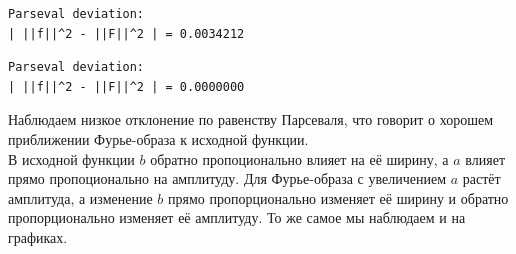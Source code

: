 \documentclass[a4paper]{article}
\begin{document}
\begin{minipage}{0.33\textwidth}
\begin{lstlisting}[caption={$a = 2$, $b = 1$}, numbers=none]
Parseval deviation:
| ||f||^2 - ||F||^2 | = 0.0034212
\end{lstlisting}
\end{minipage}\hfill
\begin{minipage}{0.33\textwidth}
\begin{lstlisting}[caption={$a = 2$, $b = 2$}, numbers=none]
Parseval deviation:
| ||f||^2 - ||F||^2 | = 0.0000000
\end{lstlisting}
\end{minipage}
Наблюдаем низкое отклонение по равенству Парсеваля, что говорит о хорошем приближении Фурье-образа к исходной функции.\\[0.5em]
В исходной функции $b$ обратно пропоционально влияет на её ширину, а $a$ влияет прямо пропоционально на амплитуду. Для Фурье-образа с увеличением $a$ растёт амплитуда, а изменение $b$ прямо пропорционально изменяет её ширину и обратно пропорционально изменяет её амплитуду. То же самое мы наблюдаем и на графиках.
\end{document}

